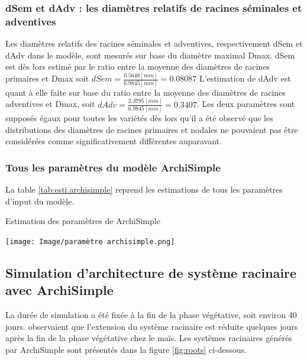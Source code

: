 \subsubsection{dSem et dAdv : les diamètres relatifs de racines séminales et adventives}

Les diamètres relatifs des racines séminales et adventives, respectivement dSem et dAdv dans le modèle, sont mesurés sur base du diamètre maximal Dmax.
dSem est dès lors estimé par le ratio entre la moyenne des diamètres de racines primaires et Dmax soit $dSem=\frac{0.5648[mm]}{6.9845[mm]} = 0.08087$
L'estimation de dAdv est quant à elle faite sur base du ratio entre la moyenne des diamètres de racines adventives et Dmax, soit $dAdv = \frac{2.3795[mm]}{6.9845[mm]} = 0.3407$.
Les deux paramètres sont supposés égaux pour toutes les variétés dès lors qu'il a été observé que les distributions des diamètres de racines primaires et nodales ne pouvaient pas être considérées comme significativement différentes auparavant.

\subsubsection{Tous les paramètres du modèle ArchiSimple}

La table \ref{tab:esti.archisimple} reprend les estimations de tous les paramètres d'input du modèle.

\begin{table}[ht]
    \centering
    \caption{Estimation des paramètres de ArchiSimple}
    \texttt{[image: Image/paramètre archisimple.png]}
    \label{tab:esti.archisimple}
\end{table}

\subsection{Simulation d'architecture de système racinaire avec ArchiSimple}

La durée de simulation a été fixée à la fin de la phase végétative, soit environ 40 jours.
\cite{pellerinand_evaluation_1994} observaient que l'extension du système racinaire est réduite quelques jours après la fin de la phase végétative chez le maïs.
Les systèmes racinaires générés par ArchiSimple sont présentés dans la figure \ref{fig:roots} ci-dessous.
\newpage

